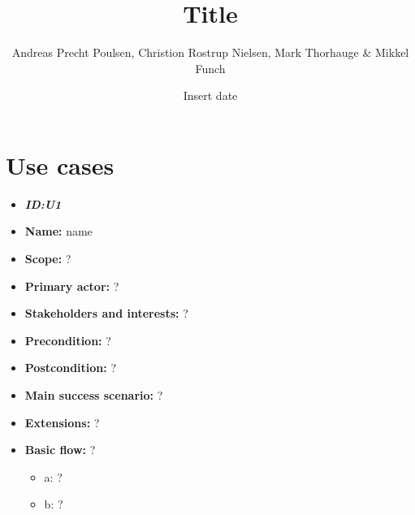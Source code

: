 \documentclass[a4paper, 10pt]{article}
\begin{document}
\title{Title}
\author{Andreas Precht Poulsen, Christion Rostrup Nielsen, Mark Thorhauge \& Mikkel Funch}
\date{Insert date}
\maketitle

\section{Use cases}
\begin{itemize}\itemsep1pt 
\item \textbf{\emph{ID:U1}}
\item \textbf{Name:} name
\item \textbf{Scope:} ?
\item \textbf{Primary actor:} ?
\item \textbf{Stakeholders and interests:} ?
\item \textbf{Precondition:} ?
\item \textbf{Postcondition:} ?
\item \textbf{Main success scenario:} ?
\item \textbf{Extensions:} ?
\item \textbf{Basic flow:} ?

\begin{itemize}
\item a: ?
\item b: ?

\end{itemize}
\end{itemize}
\end{document}
